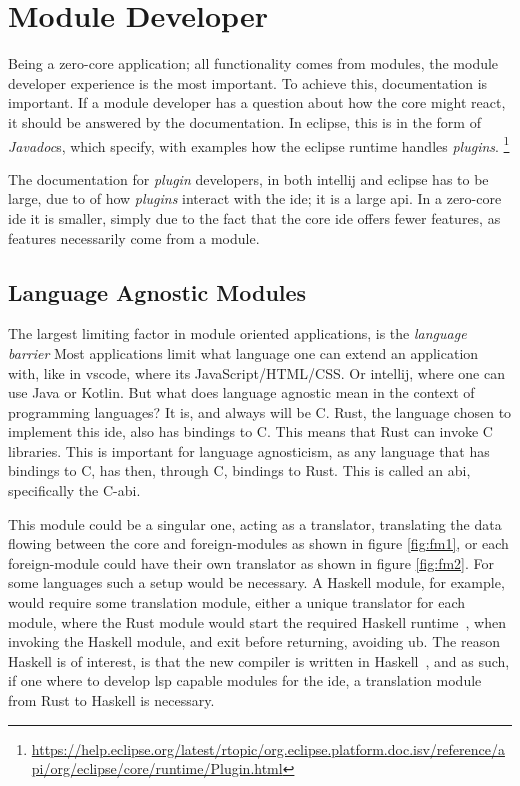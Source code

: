 \section{Module Developer}

Being a zero-core application; all functionality comes from modules, the module
developer experience is the most important. To achieve this, documentation is
important. If a module developer has a question about how the core might react,
it should be answered by the documentation. In \gls*{eclipse}, this is in the
form of \textit{Javadoc}s, which specify, with examples how the \gls*{eclipse}
runtime handles \textit{plugins}. \footnote{\url{https://help.eclipse.org/latest/rtopic/org.eclipse.platform.doc.isv/reference/api/org/eclipse/core/runtime/Plugin.html}}

The documentation for \textit{plugin} developers, in both \gls*{intellij} and
\gls*{eclipse} has to be large, due to of how \textit{plugins} interact with the
\gls*{ide}; it is a large \gls*{api}. In a zero-core \gls*{ide} it is smaller,
simply due to the fact that the core \gls*{ide} offers fewer features, as features
necessarily come from a module.

\subsection{Language Agnostic Modules}

The largest limiting factor in module oriented applications, is the
\textit{language barrier} Most applications limit what language one can extend
an application with, like in \gls*{vscode}, where its JavaScript/HTML/CSS. Or
\gls*{intellij}, where one can use Java or Kotlin. But what does language agnostic
mean in the context of programming languages? It is, and always will be C. Rust,
the language chosen to implement this \gls*{ide}, also has bindings to C. This
means that Rust can invoke C libraries. This is important for language
agnosticism, as any language that has bindings to C, has then, through C,
bindings to Rust. This is called an \gls*{abi}, specifically the C-\gls*{abi}.

This module could be a singular one, acting as a translator, translating the
data flowing between the core and foreign-modules as shown in figure
\ref{fig:fm1}, or each foreign-module could have their own translator as shown
in figure \ref{fig:fm2}. For some languages such a setup would be necessary.
A Haskell module, for example, would require some translation module, either a
unique translator for each module, where the Rust module would start the
required Haskell runtime~\cite{ghcRts}, when invoking the Haskell module, and
exit before returning, avoiding \gls*{ub}. The reason Haskell is of interest,
is that the new compiler is written in Haskell~\cite{wiig}, and as such, if one
where to develop \gls*{lsp} capable modules for the \gls*{ide}, a translation
module from Rust to Haskell is necessary.

